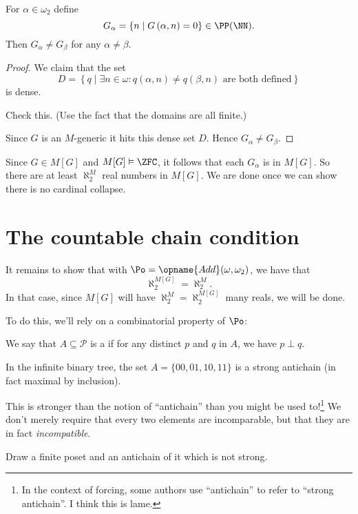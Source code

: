 \begin{lemma}
	For $\alpha \in \omega_2$ define
	\[ G_\alpha = \left\{ n \mid G\left( \alpha,n \right) = 0 \right\} \in \PP(\NN). \]
	Then $G_\alpha \neq G_\beta$ for any $\alpha \neq \beta$.
\end{lemma}
\begin{proof}
	We claim that the set
	\[ D = \left\{ q \mid \exists n \in \omega :
		q\left( \alpha, n \right) \neq q\left( \beta, n \right)
		\text{ are both defined}
	\right\} \]
	is dense.
	\begin{ques}
		Check this.
		(Use the fact that the domains are all finite.)
	\end{ques}

	Since $G$ is an $M$-generic it hits this dense set $D$.
	Hence $G_\alpha \neq G_\beta$.
\end{proof}

Since $G \in M[G]$ and $M[G] \vDash \ZFC$,
it follows that each $G_\alpha$ is in $M[G]$.
So there are at least $\aleph_2^M$ real numbers in $M[G]$.
We are done once we can show there is no cardinal collapse.

\section{The countable chain condition}
It remains to show that with $\Po = \opname{Add}(\omega, \omega_2)$, we have that
\[ \aleph_2^{M[G]} = \aleph_2^M. \]
In that case, since $M[G]$ will have $\aleph_2^M = \aleph_2^{M[G]}$ many reals, we will be done.

To do this, we'll rely on a combinatorial property of $\Po$:
\begin{definition}
	We say that $A \subseteq \mathcal P$ is a 
	if for any distinct $p$ and $q$ in $A$, we have $p \perp q$.
\end{definition}
\begin{example}
	In the infinite binary tree, 
	the set $A = \{00, 01, 10, 11\}$ is a strong antichain
	(in fact maximal by inclusion).
\end{example}
This is stronger than the notion of ``antichain'' than you might be used to!\footnote{%
	In the context of forcing, some authors use ``antichain'' to refer to ``strong antichain''.
	I think this is lame.}
We don't merely require that every two elements are incomparable,
but that they are in fact \emph{incompatible}.
\begin{ques}
	Draw a finite poset and an antichain of it which is not strong.
\end{ques}

